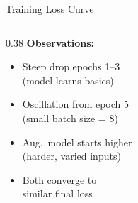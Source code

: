 \documentclass[aspectratio=169, 10pt]{beamer}
\begin{document}
\begin{frame}{Training Loss Curve}
\begin{columns}[T]
\begin{column}{0.38\textwidth}
  \vspace{0.1cm}
  \textbf{Observations:}
  \begin{itemize}
    \item Steep drop epochs 1–3\\
      (model learns basics)
    \item Oscillation from epoch 5\\
      (small batch size = 8)
    \item Aug.~model starts higher\\
      (harder, varied inputs)
    \item Both converge to\\
      similar final loss
  \end{itemize}
\end{column}
\end{columns}
\end{frame}
\end{document}
